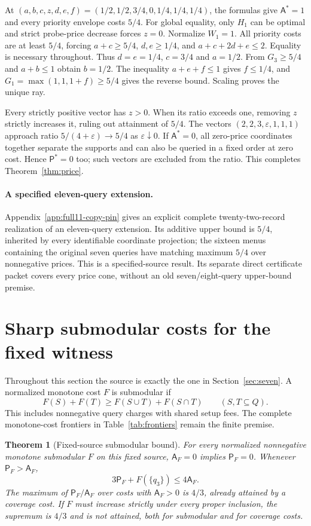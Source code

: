 \documentclass[pdflatex,sn-mathphys-num]{sn-jnl}
\newcommand{\A}{\mathsf{A}}
\newcommand{\Pcost}{\mathsf{P}}
\theoremstyle{thmstyleone}
\newtheorem{theorem}{Theorem}
\theoremstyle{thmstylethree}
\theoremstyle{thmstyletwo}
\begin{document}
At $(a,b,c,z,d,e,f)=(1/2,1/2,3/4,0,1/4,1/4,1/4)$, the formulas give $\A^*=1$ and every priority envelope costs $5/4$. For global equality, only $H_1$ can be optimal and strict probe-price decrease forces $z=0$. Normalize $W_1=1$. All priority costs are at least $5/4$, forcing $a+c\geq5/4$, $d,e\geq1/4$, and $a+c+2d+e\leq2$. Equality is necessary throughout. Thus $d=e=1/4$, $c=3/4$ and $a=1/2$. From $G_3\geq5/4$ and $a+b\leq1$ obtain $b=1/2$. The inequality $a+e+f\leq1$ gives $f\leq1/4$, and $G_1=\max(1,1,1+f)\geq5/4$ gives the reverse bound. Scaling proves the unique ray.

Every strictly positive vector has $z>0$. When its ratio exceeds one, removing $z$ strictly increases it, ruling out attainment of $5/4$. The vectors $(2,2,3,\varepsilon,1,1,1)$ approach ratio $5/(4+\varepsilon)\to5/4$ as $\varepsilon\downarrow0$. If $\A^*=0$, all zero-price coordinates together separate the supports and can also be queried in a fixed order at zero cost. Hence $\Pcost^*=0$ too; such vectors are excluded from the ratio. This completes Theorem~\ref{thm:price}.

\paragraph*{A specified eleven-query extension.}
Appendix~\ref{app:full11-copy-pin} gives an explicit complete
twenty-two-record realization of an eleven-query extension.
Its additive upper bound is $5/4$, inherited by every identifiable coordinate
projection; the sixteen menus containing the original seven queries have
matching maximum $5/4$ over nonnegative prices. This is a specified-source
result. Its separate direct certificate packet covers every price cone,
without an old seven/eight-query upper-bound premise.

\section{Sharp submodular costs for the fixed witness}\label{sec:submodular}
Throughout this section the source is exactly the one in Section~\ref{sec:seven}. A normalized monotone cost $F$ is submodular if
\[
 F(S)+F(T)\geq F(S\cup T)+F(S\cap T)\qquad(S,T\subseteq Q).
\]
This includes nonnegative query charges with shared setup fees. The complete monotone-cost frontiers in Table~\ref{tab:frontiers} remain the finite premise.

\begin{theorem}[Fixed-source submodular bound]\label{thm:submodular}
For every normalized nonnegative monotone submodular $F$ on this fixed source, $\A_F=0$ implies $\Pcost_F=0$. Whenever $\Pcost_F>\A_F$,
\begin{equation}\label{eq:strengthened}
 3\Pcost_F+F(\{q_3\})\leq4\A_F.
\end{equation}
The maximum of $\Pcost_F/\A_F$ over costs with $\A_F>0$ is $4/3$, already attained by a coverage cost. If $F$ must increase strictly under every proper inclusion, the supremum is $4/3$ and is not attained, both for submodular and for coverage costs.
\end{theorem}
\end{document}
